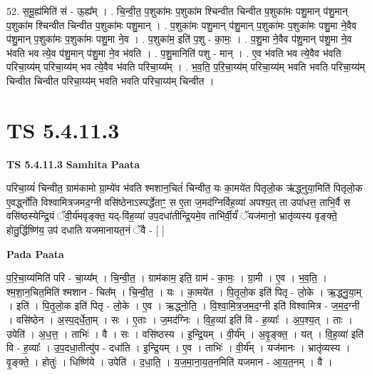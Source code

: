 \documentclass[17pt]{extarticle}
\begin{document}
52. स॒मू॒ह्य॑मिति॑ सं - ऊ॒ह्य᳚म् । . चि॒न्वी॒त॒ प॒शुका॑मः प॒शुका॑म श्चिन्वीत चिन्वीत प॒शुका॑मः पशु॒मान् प॑शु॒मान् प॒शुका॑म श्चिन्वीत चिन्वीत प॒शुका॑मः पशु॒मान् । . प॒शुका॑मः पशु॒मान् प॑शु॒मान् प॒शुका॑मः प॒शुका॑मः पशु॒मा ने॒वैव प॑शु॒मान् प॒शुका॑मः प॒शुका॑मः पशु॒मा ने॒व । . प॒शुका॑म॒ इति॑ प॒शु - का॒मः॒ । . प॒शु॒मा ने॒वैव प॑शु॒मान् प॑शु॒मा ने॒व भ॑वति भव त्ये॒व प॑शु॒मान् प॑शु॒मा ने॒व भ॑वति । . प॒शु॒मानिति॑ पशु - मान् । . ए॒व भ॑वति भव त्ये॒वैव भ॑वति परिचा॒य्य॑म् परिचा॒य्य॑म् भव त्ये॒वैव भ॑वति परिचा॒य्य᳚म् । . भ॒व॒ति॒ प॒रि॒चा॒य्य॑म् परिचा॒य्य॑म् भवति भवति परिचा॒य्य॑म् चिन्वीत चिन्वीत परिचा॒य्य॑म् भवति भवति परिचा॒य्य॑म् चिन्वीत । \newline
\pagebreak
{}

\section{ TS 5.4.11.3 }

\textbf{TS 5.4.11.3 } \newline
\textbf{Samhita Paata} \newline

परिचा॒य्यं॑ चिन्वीत॒ ग्राम॑कामो ग्रा॒म्ये॑व भ॑वति श्मशान॒चितं॑ चिन्वीत॒ यः का॒मये॑त पितृलो॒क ऋ॑द्ध्नुया॒मिति॑ पितृलो॒क ए॒वर्द्ध्नो॑ति विश्वामित्रजमद॒ग्नी वसि॑ष्ठेनाऽस्पर्द्धेताꣳ॒॒ स ए॒ता ज॒मद॑ग्निर्विह॒व्या॑ अपश्य॒त् ता उपा॑धत्त॒ ताभि॒र्वै स वसि॑ष्ठस्येन्द्रि॒यं ॅवी॒र्य॑मवृङ्क्त॒ यद्-वि॑ह॒व्या॑ उप॒दधा॑तीन्द्रि॒यमे॒व ताभि॑र्वी॒र्यं॑ ॅयज॑मानो॒ भ्रातृ॑व्यस्य वृङ्क्ते॒ होतु॒र्द्धिष्णि॑य॒ उप॑ दधाति यजमानायत॒नं ॅवै - [  ] \newline

\textbf{Pada Paata} \newline

प॒रि॒चा॒य्य॑मिति॑ परि - चा॒य्य᳚म् । चि॒न्वी॒त॒ । ग्राम॑काम॒ इति॒ ग्राम॑ - का॒मः॒ । ग्रा॒मी । ए॒व । भ॒व॒ति॒ । श्म॒शा॒न॒चित॒मिति॑ श्मशान - चित᳚म् । चि॒न्वी॒त॒ । यः । का॒मये॑त । पि॒तृ॒लो॒क इति॑ पितृ - लो॒के । ऋ॒द्ध्नु॒या॒म् । इति॑ । पि॒तृ॒लो॒क इति॑ पितृ - लो॒के । ए॒व । ऋ॒द्ध्नो॒ति॒ । वि॒श्वा॒मि॒त्र॒ज॒म॒द॒ग्नी इति॑ विश्वामित्र - ज॒म॒द॒ग्नी । वसि॑ष्ठेन । अ॒स्प॒द्‌र्धे॒ता॒म् । सः । ए॒ताः । ज॒मद॑ग्निः । वि॒ह॒व्या॑ इति॑ वि - ह॒व्याः᳚ । अ॒प॒श्य॒त् । ताः । उपेति॑ । अ॒ध॒त्त॒ । ताभिः॑ । वै । सः । वसि॑ष्ठस्य । इ॒न्द्रि॒यम् । वी॒र्य᳚म् । अ॒वृ॒ङ्क्त॒ । यत् । वि॒ह॒व्या॑ इति॑ वि - ह॒व्याः᳚ । उ॒प॒दधा॒तीत्यु॑प - दधा॑ति । इ॒न्द्रि॒यम् । ए॒व । ताभिः॑ । वी॒र्य᳚म् । यज॑मानः । भ्रातृ॑व्यस्य । वृ॒ङ्क्ते॒ । होतुः॑ । धिष्णि॑ये । उपेति॑ । द॒धा॒ति॒ । य॒ज॒मा॒ना॒य॒त॒नमिति॑ यजमान - आ॒य॒त॒नम् । वै ।  \newline
\end{document}

